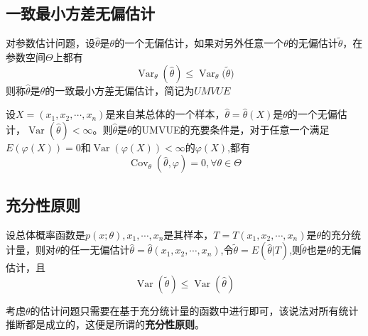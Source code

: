\subsection{一致最小方差无偏估计}
\begin{definition}
    对参数估计问题，设$\hat{\theta}$是$\theta$的一个无偏估计，如果对另外任意一个$\theta$的无偏估计$\tilde{\theta}$，在参数空间$\Theta$上都有
    $$
        \operatorname{Var}_{\theta}(\hat{\theta}) \leq \operatorname{Var}_{\theta}({\tilde{\theta})}
    $$
    则称$\hat{\theta}$是$\theta$的一致最小方差无偏估计，简记为$UMVUE$
\end{definition}
\begin{theorem}
    设$X=(x_1,x_2,\cdots,x_n)$是来自某总体的一个样本，$\hat{\theta}=\hat{\theta}(X)$是$\theta$的一个无偏估计，$\operatorname{Var}(\hat{\theta})<\infty$。则$\hat{\theta}$是$\theta$的UMVUE的充要条件是，对于任意一个满足$E(\varphi(X))=0$和$\operatorname{Var}(\varphi(X))<\infty$的$\varphi(X)$,都有
    $$
        \operatorname{Cov}_{\theta}(\hat{\theta},\varphi)=0 , \forall \theta \in \Theta
    $$
\end{theorem}
\subsection{充分性原则}
\begin{theorem}
    设总体概率函数是$p(x;\theta),x_1,\cdots,x_n$是其样本，$T=T(x_1,x_2,\cdots,x_n)$是$\theta$的充分统计量，则对$\theta$的任一无偏估计$\hat{\theta}=\hat{\theta}(x_1,x_2,\cdots,x_n)$,令$\tilde{\theta}=E(\hat{\theta}|T)$,则$\tilde{\theta}$也是$\theta$的无偏估计，且
    $$
        \operatorname{Var}(\tilde{\theta}) \leq \operatorname{Var}(\hat{\theta})
    $$
\end{theorem}
考虑$\theta$的估计问题只需要在基于充分统计量的函数中进行即可，该说法对所有统计推断都是成立的，这便是所谓的\textbf{充分性原则}。

